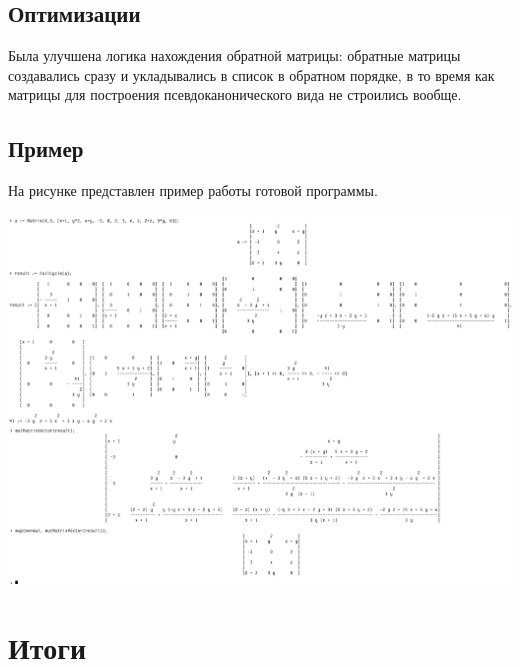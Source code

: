 \documentclass[14pt, a4paper]{extreport}
\begin{document}
	\section{Оптимизации}
	Была улучшена логика нахождения обратной матрицы: обратные матрицы
	создавались сразу и укладывались в список в обратном порядке, в то время как
	матрицы для построения псевдоканонического вида не строились вообще.
	\newpage
	\section{Пример}
	На рисунке представлен пример работы готовой программы.\\
	\begin{center}
		\includegraphics[width=\textwidth]{result2.png}
	\end{center}
\chapter{Итоги}
\end{document}
